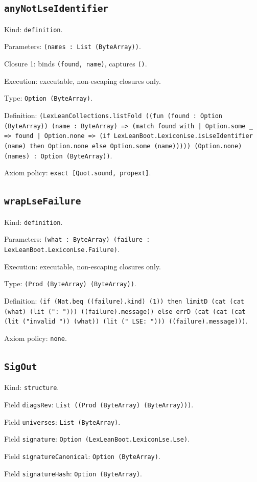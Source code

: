 \documentclass[11pt]{article}
\begin{document}
\subsection*{\texttt{anyNotLseIdentifier}}
\noindent Kind: \texttt{definition}.\par
\noindent Parameters: \texttt{(names : List (ByteArray))}.\par
\noindent Closure 1: binds \texttt{(found, name)}, captures \texttt{()}.\par
\noindent Execution: executable, non-escaping closures only.\par
\noindent Type: \texttt{Option (ByteArray)}.\par
\noindent Definition: \texttt{(LexLeanCollections.listFold ((fun (found : Option (ByteArray)) (name : ByteArray) => (match found with | Option.some \_ => found | Option.none => (if LexLeanBoot.LexiconLse.isLseIdentifier (name) then Option.none else Option.some (name))))) (Option.none) (names) : Option (ByteArray))}.\par
\noindent Axiom policy: \texttt{exact [Quot.sound, propext]}.\par
\subsection*{\texttt{wrapLseFailure}}
\noindent Kind: \texttt{definition}.\par
\noindent Parameters: \texttt{(what : ByteArray) (failure : LexLeanBoot.LexiconLse.Failure)}.\par
\noindent Execution: executable, non-escaping closures only.\par
\noindent Type: \texttt{(Prod (ByteArray) (ByteArray))}.\par
\noindent Definition: \texttt{(if (Nat.beq ((failure).kind) (1)) then limitD (cat (cat (what) (lit (": "))) ((failure).message)) else errD (cat (cat (cat (lit ("invalid ")) (what)) (lit (" LSE: "))) ((failure).message)))}.\par
\noindent Axiom policy: \texttt{none}.\par
\subsection*{\texttt{SigOut}}
\noindent Kind: \texttt{structure}.\par
\noindent Field \texttt{diagsRev}: \texttt{List ((Prod (ByteArray) (ByteArray)))}.\par
\noindent Field \texttt{universes}: \texttt{List (ByteArray)}.\par
\noindent Field \texttt{signature}: \texttt{Option (LexLeanBoot.LexiconLse.Lse)}.\par
\noindent Field \texttt{signatureCanonical}: \texttt{Option (ByteArray)}.\par
\noindent Field \texttt{signatureHash}: \texttt{Option (ByteArray)}.\par
\end{document}
